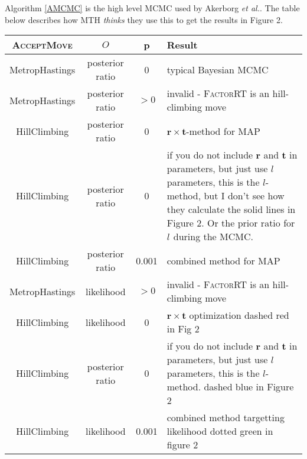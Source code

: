 \documentclass{llncs}
\newcommand{\etal}[0]{{\em et al.}\xspace}
\newcommand{\edgeLen}[1]{\ensuremath{l_{#1}}\xspace}
\newcommand{\ratevec}[0]{\ensuremath{\mathbf{r}}\xspace}
\newcommand{\timevec}[0]{\ensuremath{\mathbf{t}}\xspace}
\begin{document}
Algorithm \ref{AMCMC} is the high level MCMC used by Akerborg \etal.
The table below describes how MTH {\em thinks} they use this to 
get the results in Figure 2.
\begin{table}
    \begin{tabular}{c|c|c|p{20em}}
\textsc{AcceptMove} & $O$ & p & Result \\
\hline
MetropHastings & posterior ratio & 0 & typical Bayesian MCMC \\
\hline
MetropHastings & posterior ratio & $>0$ & invalid - \textsc{FactorRT} is an hill-climbing move\\
\hline
HillClimbing & posterior ratio & 0 & $\ratevec\times \timevec$-method for MAP \\
\hline
HillClimbing & posterior ratio & 0  & if you do not include $\ratevec$ and $\timevec$ in parameters, but just use $\edgeLen{}$ parameters, this is the $l$-method, but I don't see how they calculate the solid lines in Figure 2. Or the prior ratio for $\edgeLen{}$ during the MCMC. \\
\hline
HillClimbing & posterior ratio & 0.001 & combined method for MAP \\
\hline
MetropHastings & likelihood & $>0$ & invalid - \textsc{FactorRT} is an hill-climbing move\\
\hline
HillClimbing & likelihood & 0 & $\ratevec\times\timevec$ optimization dashed red in Fig 2 \\
\hline
HillClimbing & posterior ratio & 0  & if you do not include $\ratevec$ and $\timevec$ in parameters, but just use $\edgeLen{}$ parameters, this is the $l$-method. dashed blue in Figure 2 \\
\hline
HillClimbing & likelihood & 0.001 & combined method targetting likelihood dotted green in figure 2 \\
\hline
\end{tabular}
\end{table}
\end{document}
